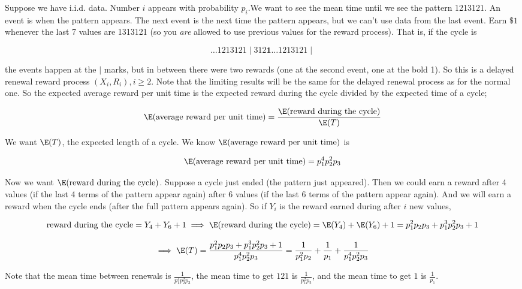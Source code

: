 \begin{example}Suppose we have i.i.d. data. Number \(i\) appears with probability \(p_i\).We want to see the mean time until we see the pattern 1213121. An event is when the pattern appears. The next event is the next time the pattern appears, but we can't use data from the last event. Earn \(\$1\) whenever the last 7 values are 1313121 (so you \textit{are} allowed to use previous values for the reward process). That is, if the cycle is 

\[
\ldots 1213121 \mid 312 \textbf{1} \ldots 1213121 \mid
\]

the events happen at the \(\mid\) marks, but in between there were two rewards (one at the second event, one at the bold 1). So this is a delayed renewal reward process \((X_i, R_i), i \geq 2\). Note that the limiting results will be the same for the delayed renewal process as for the normal one. So the expected average reward per unit time is the expected reward during the cycle divided by the expected time of a cycle;

\[
\E( \text{average reward per unit time}) = \frac{ \E( \text{reward during the cycle}) }{\E(T)}
\]

We want \(\E(T)\), the expected length of a cycle. We know \(\E( \text{average reward per unit time})\) is 

\[
\E( \text{average reward per unit time}) =p_1^4 p_2^2 p_3
\]

Now we want \( \E( \text{reward during the cycle}) \). Suppose a cycle just ended (the pattern just appeared). Then we could earn a reward after 4 values (if the last 4 terms of the pattern appear again) after 6 values (if the last 6 terms of the pattern appear again). And we will earn a reward when the cycle ends (after the full pattern appears again). So if \(Y_i\) is the reward earned during after \(i\) new values,

\[
\text{reward during the cycle} = Y_4 + Y_6 + 1 \implies \E(\text{reward during the cycle} ) = \E(Y_4) + \E(Y_6) + 1  =p_1^2p_2 p_3 + p_1^3p_2^2p_3 + 1 
\]

\[
\implies \E(T) = \frac{p_1^2p_2 p_3 + p_1^3p_2^2p_3 + 1 }{p_1^4 p_2^2 p_3 } = \frac{1}{p_1^2 p_2} + \frac{1}{p_1} + \frac{1}{p_1^4 p_2^2 p_3 }
\]

Note that the mean time between renewals is \(\frac{1}{p_1^4 p_2^2 p_3 }\), the mean time to get \(121\) is \(\frac{1}{p_1^2 p_2}\), and the mean time to get \(1\) is \(\frac{1}{p_1}\).

\end{example}

